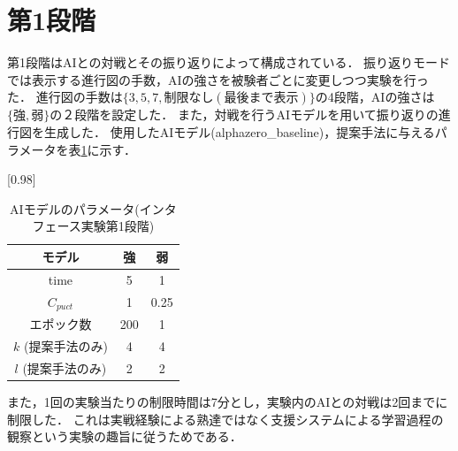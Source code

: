 \section{第1段階}
第1段階はAIとの対戦とその振り返りによって構成されている．
振り返りモードでは表示する進行図の手数，AIの強さを被験者ごとに変更しつつ実験を行った．
進行図の手数は$\{3, 5, 7, 制限なし(最後まで表示)\}$の4段階，AIの強さは$\{強,弱\}$の２段階を設定した．
また，対戦を行うAIモデルを用いて振り返りの進行図を生成した．
使用したAIモデル(alphazero\_baseline)，提案手法に与えるパラメータを表\ref{table:param-system}に示す．
\begin{table}[H]
	\caption{AIモデルのパラメータ(インタフェース実験第1段階)}
    \label{table:param-system}
	\centering
	\scalebox{0.98}[0.98]{
		\begin{tabular}{c|c|c}
			モデル&強&弱\\\hline
			time    & 5 & 1 \\ 
			$C_{puct}$ & 1   & 0.25 \\
            エポック数 & 200 & 1 \\
			$k$ (提案手法のみ)     & 4 & 4 \\
			$l$ (提案手法のみ)     & 2 & 2 \\

		\end{tabular}
	}
	
\end{table}
また，1回の実験当たりの制限時間は7分とし，実験内のAIとの対戦は2回までに制限した．
これは実戦経験による熟達ではなく支援システムによる学習過程の観察という実験の趣旨に従うためである．
